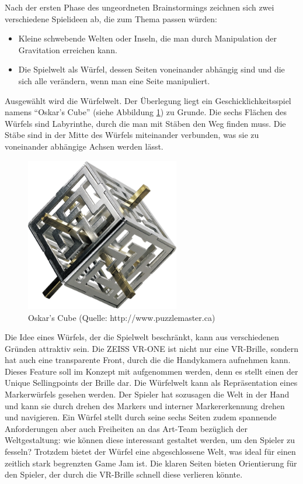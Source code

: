 
Nach der ersten Phase des ungeordneten Brainstormings zeichnen sich zwei verschiedene Spielideen ab, die zum Thema passen würden:
\begin{itemize}
\item Kleine schwebende Welten oder Inseln, die man durch Manipulation der Gravitation erreichen kann.
\item Die Spielwelt als Würfel, dessen Seiten voneinander abhängig sind und die sich alle verändern, wenn man eine Seite manipuliert.
\end{itemize}

Ausgewählt wird die Würfelwelt. Der Überlegung liegt ein Geschicklichkeitsspiel namens \enquote{Oskar's Cube} (siehe  Abbildung \ref{fig:Oskar}) zu Grunde. Die sechs Flächen des Würfels sind Labyrinthe, durch die man mit Stäben den Weg finden muss. Die Stäbe sind in der Mitte des Würfels miteinander verbunden, was sie zu voneinander abhängige Achsen werden lässt.

\begin{figure}[ht]%
	\centering
		\includegraphics[width=0.6\textwidth]{images/oscar}
	\caption{Oskar's Cube (Quelle: http://www.puzzlemaster.ca)}
	\label{fig:Oskar}
\end{figure}

Die Idee eines Würfels, der die Spielwelt beschränkt, kann aus verschiedenen Gründen attraktiv sein. Die ZEISS VR-ONE ist nicht nur eine VR-Brille, sondern hat auch eine transparente Front, durch die die Handykamera aufnehmen kann. Dieses Feature soll im Konzept mit aufgenommen werden, denn es stellt einen der Unique Sellingpoints der Brille dar. Die Würfelwelt kann als Repräsentation eines Markerwürfels gesehen werden. Der Spieler hat sozusagen die Welt in der Hand und kann sie durch drehen des Markers und interner Markererkennung drehen und navigieren. 
Ein Würfel stellt durch seine sechs Seiten zudem spannende Anforderungen aber auch Freiheiten an das Art-Team bezüglich der Weltgestaltung: wie können diese interessant gestaltet werden, um den Spieler zu fesseln?
Trotzdem bietet der Würfel eine abgeschlossene Welt, was ideal für einen zeitlich stark begrenzten Game Jam ist. Die klaren Seiten bieten Orientierung für den Spieler, der durch die VR-Brille schnell diese verlieren könnte.   
  

